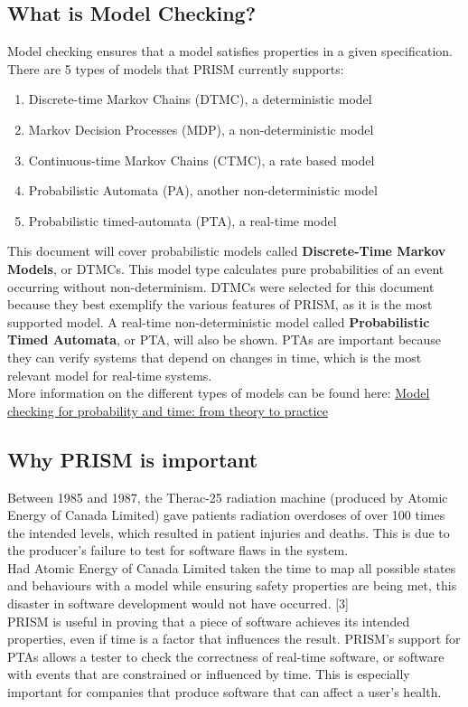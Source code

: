 \documentclass[a4paper]{article}
\begin{document}
\subsection{What is Model Checking?}
Model checking ensures that a model satisfies properties in a given specification. 
\\[1\baselineskip]
There are 5 types of models that PRISM currently supports:

\begin{enumerate}
  \item Discrete-time Markov Chains (DTMC), a deterministic model
  \item Markov Decision Processes (MDP), a non-deterministic model
  \item Continuous-time Markov Chains (CTMC), a rate based model 
  \item Probabilistic Automata (PA), another non-deterministic model
  \item Probabilistic timed-automata (PTA), a real-time model
\end{enumerate}

This document will cover probabilistic models called \textbf{Discrete-Time Markov Models}, or DTMCs. This model type calculates pure probabilities of an event occurring without non-determinism. DTMCs were selected for this document because they best exemplify the various features of PRISM, as it is the most supported model. A real-time non-deterministic model called \textbf{Probabilistic Timed Automata}, or PTA, will also be shown. PTAs are important because they can verify systems that depend on changes in time, which is the most relevant model for real-time systems. 
\\[1\baselineskip]
More information on the different types of models can be found here: \href{http://qav.comlab.ox.ac.uk/papers/lics03.pdf}{Model checking for probability and time: from theory to practice}


\subsection{Why PRISM is important}
Between 1985 and 1987, the Therac-25 radiation machine (produced by Atomic Energy of Canada Limited) gave patients radiation overdoses of over 100 times the intended levels, which resulted in patient injuries and deaths. This is due to the producer's failure to test for software flaws in the system.
\\[1\baselineskip]
Had Atomic Energy of Canada Limited taken the time to map all possible states and behaviours with a model while ensuring safety properties are being met, this disaster in software development would not have occurred. [3]
\\[1\baselineskip]
PRISM is useful in proving that a piece of software achieves its intended properties, even if time is a factor that influences the result. PRISM's support for PTAs allows a tester to check the correctness of real-time software, or software with events that are constrained or influenced by time. This is especially important for companies that produce software that can affect a user's health.
\end{document}
